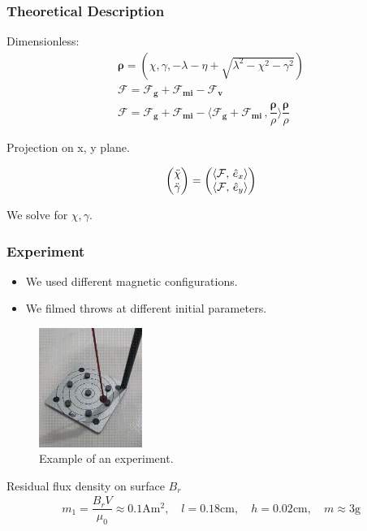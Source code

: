\documentclass{beamer}
\begin{document}

\begin{frame}

\frametitle{Theoretical Description}

Dimensionless:
\begin{gather}
\bm \rho = \left( \chi, \gamma, - \lambda - \eta + \sqrt{\lambda^2 - \chi^2 - \gamma^2} \right)\\
\mathbf{\mathcal{F}} = \mathbf{\mathcal{F}_g} + \mathbf{\mathcal{F}_{mi}} - \mathbf{\mathcal{F}_v}
\\
\mathbf{\mathcal{F}} = \mathbf{\mathcal{F}_g} + \mathbf{\mathcal{F}_{mi}} - \langle \mathbf{\mathcal{F}_g} + \mathbf{\mathcal{F}_{mi}} \, , \dfrac{\bm \rho}{\rho} \rangle \dfrac{\bm \rho}{\rho}
\end{gather}

Projection on x, y plane.

\begin{gather}
 \mqty(\ddot{\chi} \\ \ddot{\gamma}) = \mqty(\langle \mathbf{\mathcal{F}}, \, \hat{e}_x \rangle \\ \langle \mathbf{\mathcal{F}}, \, \hat{e}_y \rangle)
\end{gather}

We solve for $\chi, \gamma$.


\end{frame}



\begin{frame}

\frametitle{Experiment}
\begin{itemize}
\item
We used different magnetic configurations.
\item
We filmed throws at different initial parameters.
\end{itemize}
\begin{figure}[H]
	\centering
	\includegraphics[width=0.3\textwidth]{srednja_kin_odbojna.png}
	  \caption{Example of an experiment.}
\end{figure}

Residual flux density on surface $B_r$
\begin{gather*}
m_1 = \dfrac{B_r V}{\mu_0} \approx 0.1 \mathrm{A m^2}, \quad l = 0.18 \mathrm{cm}, \quad h = 0.02 \mathrm{cm}, \quad m \approx 3 \mathrm{g}
\end{gather*}


\end{frame}
\end{document}
